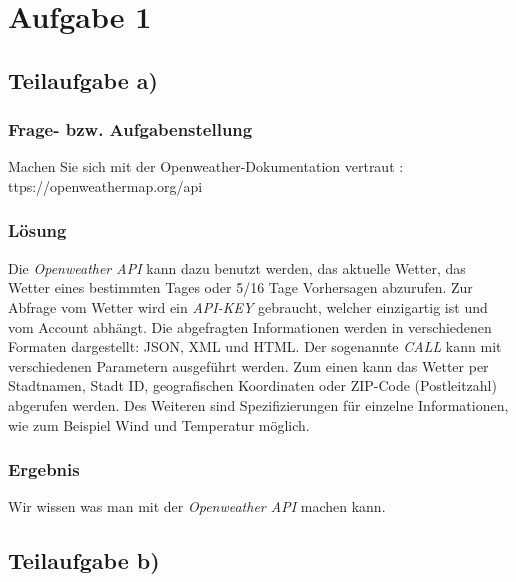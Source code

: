 \newcommand{\env}[1]{\texttt{#1}}
\newcommand{\command}[1]{\texttt{#1}}
\newcommand{\package}[1]{\texttt{\itshape#1}}
\newcommand{\engl}[1]{(engl: \textit{#1})\xspace}
\setlength{\parindent}{0pt}
\lstset{extendedchars=\true}
\lstset{inputencoding=ansinew}
\newpage

\section{Aufgabe 1}

\subsection{Teilaufgabe a)}

\subsubsection{Frage- bzw. Aufgabenstellung}

Machen Sie sich mit der Openweather-Dokumentation vertraut : ttps://openweathermap.org/api

\subsubsection{Lösung}

Die \textit{Openweather API} kann dazu benutzt werden, das aktuelle Wetter, das Wetter eines bestimmten Tages oder 5/16 Tage Vorhersagen abzurufen. 
Zur Abfrage vom Wetter wird ein \textit{API-KEY} gebraucht, welcher einzigartig ist und vom Account abhängt. Die abgefragten Informationen werden in verschiedenen Formaten dargestellt: JSON, XML und HTML.
Der sogenannte \textit{CALL} kann mit verschiedenen Parametern ausgeführt werden. Zum einen kann das Wetter per Stadtnamen, Stadt ID, geografischen Koordinaten oder ZIP-Code (Postleitzahl) abgerufen werden. 
Des Weiteren sind Spezifizierungen für einzelne Informationen, wie zum Beispiel Wind und Temperatur möglich.

\subsubsection{Ergebnis}

Wir wissen was man mit der \textit{Openweather API} machen kann.

\subsection{Teilaufgabe b)}

